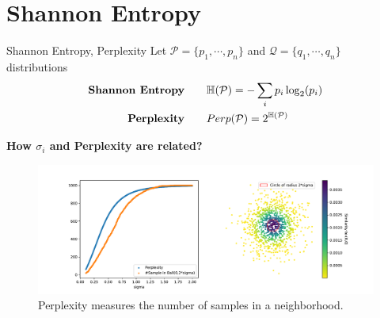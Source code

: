 \documentclass[10pt]{beamer}
\theoremstyle{definition}
\newcommand{\HBB}{\mathbb{H}}
\newcommand{\1}{\mathbbm{1}}
\newcommand{\PP}{\mathcal{P}}
\newcommand{\QQ}{\mathcal{Q}}
\begin{document}
\section{Shannon Entropy}
\begin{frame}{Shannon Entropy, Perplexity}{}
  \vfill
  Let $ \PP=\{p_1, \cdots, p_n\}$ and $\QQ=\{q_1,\cdots,q_n\}$  distributions
  \begin{equation*}
    \begin{aligned}
      \mbox{\bf Shannon Entropy}\qquad &\HBB(\PP) =
      -\sum_i p_i\log_2(p_i)\\
      \mbox{\bf Perplexity} \qquad & Perp(\PP) = 2^{\HBB(\PP)}\\
    \end{aligned}
    \label{entropy}
  \end{equation*}
  \begin{minipage}[h!]{\textwidth}
    {\bf How $\sigma_i$ and Perplexity are related?}
    \begin{figure}[h!]
      \centering
      \includegraphics[clip, scale=0.32, trim=0 0 0
      1cm]{./pic/perplexity.pdf}
      \caption{Perplexity measures the number of samples in a neighborhood.}
    \end{figure}
  \end{minipage}
\end{frame}
\end{document}
